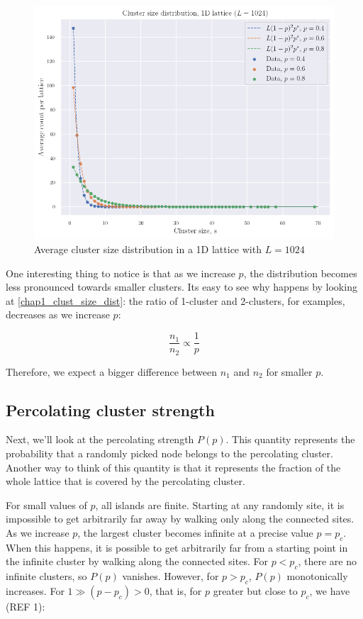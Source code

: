 \begin{figure}[H]
  \includegraphics[width=\linewidth]{Images/chap1_clust_size_dist_1024.png}
  \caption{Average cluster size distribution in a 1D lattice with $L=1024$}
  \label{fig:chap1_clust_size_dist_1024}
\end{figure}


One interesting thing to notice is that as we increase $p$, the distribution becomes less pronounced towards smaller clusters. Its easy to see why happens by looking at \eqref{chap1_clust_size_dist}: the ratio of 1-cluster and 2-clusters, for examples, decreases as we increase $p$:

$$
\frac{n_1}{n_2} \propto \frac{1}{p}
$$

Therefore, we expect a bigger difference between $n_1$ and $n_2$ for smaller $p$.

\subsection{Percolating cluster strength}

Next, we'll look at the percolating strength $P(p)$. This quantity  represents the probability that a randomly picked node belongs to the percolating cluster. Another way to think of this quantity is that it represents the fraction of the whole lattice that is covered by the percolating cluster. 

For small values of $p$, all islands are finite. Starting at any randomly site, it is impossible to get arbitrarily far away by walking only along the connected sites. As we increase $p$, the largest cluster becomes infinite at a precise value $p = p_c$. When this happens, it is possible to get arbitrarily far from a starting point in the infinite cluster by walking along the connected sites. For $p < p_c$, there are no infinite clusters, so $P(p)$ vanishes. However, for $p > p_c$, $P(p)$ monotonically increases. For $1 \gg (p - p_c) > 0$, that is, for $p$ greater  but close to $p_c$, we have (REF 1):

